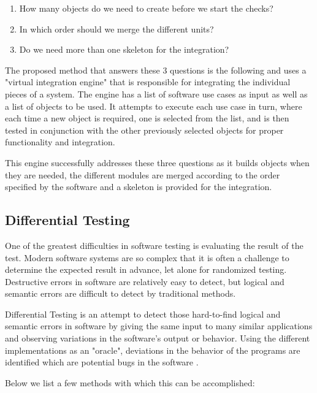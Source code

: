 \documentclass[12pt]{article}
\begin{document}
\begin{enumerate}
  \item How many objects do we need to create before we start the checks?
  \item In which order should we merge the different units?
  \item Do we need more than one skeleton for the integration?
\end{enumerate}

\par The proposed method that answers these 3 questions is the following and uses a "virtual integration engine" that is responsible for integrating the individual pieces of a system. The engine has a list of software use cases as input as well as a list of objects to be used. It attempts to execute each use case in turn, where each time a new object is required, one is selected from the list, and is then tested in conjunction with the other previously selected objects for proper functionality and integration.

\par This engine successfully addresses these three questions as it builds objects when they are needed, the different modules are merged according to the order specified by the software and a skeleton is provided for the integration.

\subsection{Differential Testing}

One of the greatest difficulties in software testing is evaluating the result of the test. Modern software systems are so complex that it is often a challenge to determine the expected result in advance, let alone for randomized testing. Destructive errors in software are relatively easy to detect, but logical and semantic errors are difficult to detect by traditional methods.

\par Differential Testing is an attempt to detect those hard-to-find logical and semantic errors in software by giving the same input to many similar applications and observing variations in the software's output or behavior. Using the different implementations as an "oracle", deviations in the behavior of the programs are identified which are potential bugs in the software \cite{william}.

Below we list a few methods with which this can be accomplished:
\end{document}

